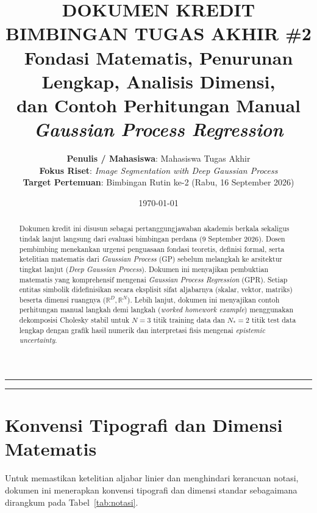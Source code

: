 \documentclass[11pt,a4paper]{article}
\title{
    \vspace{-1.0cm}
    \textbf{\Large DOKUMEN KREDIT BIMBINGAN TUGAS AKHIR \#2} \\[0.3em]
    \textbf{\large Fondasi Matematis, Penurunan Lengkap, Analisis Dimensi,}\\
    \textbf{\large dan Contoh Perhitungan Manual \textit{Gaussian Process Regression}}
}
\author{
    \textbf{Penulis / Mahasiswa}: Mahasiswa Tugas Akhir \\
    \textbf{Fokus Riset}: \textit{Image Segmentation with Deep Gaussian Process} \\
    \textbf{Target Pertemuan}: Bimbingan Rutin ke-2 (Rabu, 16 September 2026)
}
\date{\today}
\begin{document}
\maketitle
\vspace{-0.5cm}
\begin{abstract}
Dokumen kredit ini disusun sebagai pertanggungjawaban akademis berkala sekaligus tindak lanjut langsung dari evaluasi bimbingan perdana (9 September 2026). Dosen pembimbing menekankan urgensi penguasaan fondasi teoretis, definisi formal, serta ketelitian matematis dari \textit{Gaussian Process} (GP) sebelum melangkah ke arsitektur tingkat lanjut (\textit{Deep Gaussian Process}). Dokumen ini menyajikan pembuktian matematis yang komprehensif mengenai \textit{Gaussian Process Regression} (GPR). Setiap entitas simbolik didefinisikan secara eksplisit sifat aljabarnya (skalar, vektor, matriks) beserta dimensi ruangnya ($\mathbb{R}^D, \mathbb{R}^N$). Lebih lanjut, dokumen ini menyajikan contoh perhitungan manual langkah demi langkah (\textit{worked homework example}) menggunakan dekomposisi Cholesky stabil untuk $N = 3$ titik training data dan $N_* = 2$ titik test data lengkap dengan grafik hasil numerik dan interpretasi fisis mengenai \textit{epistemic uncertainty}.
\end{abstract}

\hrule
\vspace{0.3cm}
\tableofcontents
\vspace{0.4cm}
\hrule

\newpage

\section{Konvensi Tipografi dan Dimensi Matematis}
\label{sec:notasi}

Untuk memastikan ketelitian aljabar linier dan menghindari kerancuan notasi, dokumen ini menerapkan konvensi tipografi dan dimensi standar sebagaimana dirangkum pada Tabel~\ref{tab:notasi}.
\end{document}
